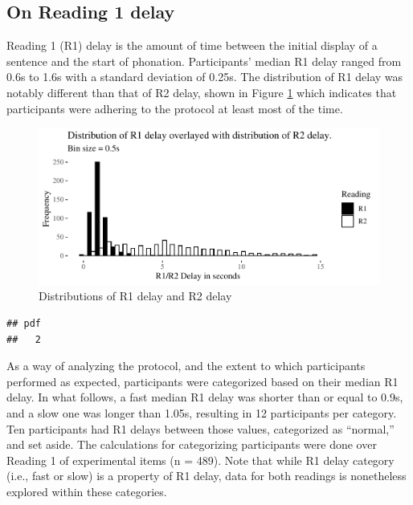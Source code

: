 \documentclass[12pt,oneside]{book}
\begin{document}
\hypertarget{on-reading-1-delay}{%
\subsection{On Reading 1 delay}\label{on-reading-1-delay}}

Reading 1 (R1) delay is the amount of time between the initial display of a sentence and the start of phonation. Participants' median R1 delay ranged from 0.6s to 1.6s with a standard deviation of 0.25s. The distribution of R1 delay was notably different than that of R2 delay, shown in Figure \ref{fig:delayComparison} which indicates that participants were adhering to the protocol at least most of the time.

\begin{figure}
\centering
\includegraphics{4-results_files/figure-latex/delayComparison-1.pdf}
\caption{\label{fig:delayComparison}Distributions of R1 delay and R2 delay}
\end{figure}

\begin{verbatim}
## pdf 
##   2
\end{verbatim}

As a way of analyzing the protocol, and the extent to which participants performed as expected, participants were categorized based on their median R1 delay. In what follows, a fast median R1 delay was shorter than or equal to 0.9s, and a slow one was longer than 1.05s, resulting in 12 participants per category. Ten participants had R1 delays between those values, categorized as ``normal,'' and set aside. The calculations for categorizing participants were done over Reading 1 of experimental items (n = 489). Note that while R1 delay category (i.e., fast or slow) is a property of R1 delay, data for both readings is nonetheless explored within these categories.
\end{document}
